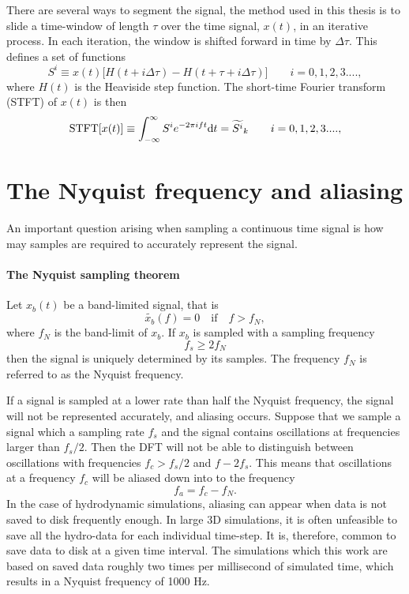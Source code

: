 There are several ways to segment the signal, the method used in this thesis is to slide a time-window of length $\tau$ over the time signal, $x(t)$, in an iterative
process. In each iteration, the window is shifted forward in time by $\Delta \tau$.
This defines a set of functions
\begin{equation}
S^i \equiv x(t) \big[ H(t+i \Delta \tau) - H(t + \tau + i \Delta \tau) \big] \qquad i = 0,1,2,3 ....,
\end{equation}
where $H(t)$ is the Heaviside step function.
The short-time Fourier transform (STFT) of $x(t)$ is then
\begin{equation}\label{eqSA:STFT}
\text{STFT}[x(t)] \equiv \int_{-\infty}^{\infty} S^i e^{-2 \pi i f t} \mathrm{d} t 
= \widetilde{S^i}_k \qquad i = 0,1,2,3 ....,                                                         
\end{equation}

\section{The Nyquist frequency and aliasing}
An important question arising when sampling a continuous 
time signal is how may samples are required to accurately represent the
signal.
\begin{mdframed}[nobreak=true]
\paragraph{The Nyquist sampling theorem}
Let $x_b(t)$ be a band-limited signal, that is
\begin{equation}
\widetilde{x_b}(f) = 0 \quad \text{if} \quad f > f_N,
\end{equation}
where $f_N$ is the band-limit of $x_b$. If $x_b$ is sampled with a sampling frequency
\begin{equation}
f_s \geq 2 f_N
\end{equation}
then the signal is uniquely determined by its samples. The frequency $f_N$ is referred to 
as the Nyquist frequency.
\end{mdframed}

If a signal is sampled at a lower rate than half the Nyquist frequency,
the signal will not be represented accurately, and aliasing occurs.
Suppose that we sample a signal which a sampling rate $f_s$ and the signal contains oscillations at frequencies larger than $f_s /2$. Then the 
DFT will not be able to distinguish between oscillations with 
frequencies $f_c > f_s/2$ and $f - 2 f_s$. This means that oscillations at a frequency
$f_c$ will be aliased down into to the frequency
\begin{equation}
f_a = f_c - f_N.
\end{equation}
In the case of hydrodynamic simulations, aliasing can appear when data is not saved
to disk frequently enough. In large 3D simulations, it is often unfeasible to save all the hydro-data for each individual time-step. It is, therefore, common to
save data to disk at a given time interval. The simulations which this work are based on saved data roughly two times per millisecond of simulated time, which results in a Nyquist frequency of 1000 Hz. 

